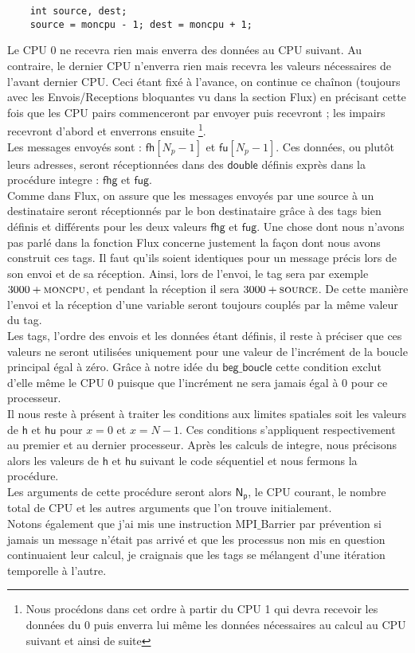 \documentclass[french]{article}
\newcommand{\hhu}{$\mathsf{h}$ et $\mathsf{hu}$}
\begin{document}
\begin{minipage}{455 pt}
\begin{lstlisting}
	int source, dest;	
	source = moncpu - 1; dest = moncpu + 1;
\end{lstlisting}
\end{minipage}

Le CPU 0 ne recevra rien mais enverra des données au CPU suivant. Au contraire, le dernier CPU n'enverra rien mais recevra les valeurs nécessaires de l'avant dernier CPU. Ceci étant fixé à l'avance, on continue ce chaînon (toujours avec les Envois/Receptions bloquantes vu dans la section Flux) en précisant cette fois que les CPU pairs commenceront par envoyer puis recevront ; les impairs recevront d'abord et enverrons ensuite \footnote{Nous procédons dans cet ordre à partir du CPU 1 qui devra recevoir les données du 0 puis enverra lui même les données nécessaires au calcul au CPU suivant et ainsi de suite}. \\
Les messages envoyés sont : $\mathsf{fh}[N_p -1]$ et $\mathsf{fu}[N_p -1]$. Ces données, ou plutôt leurs adresses, seront réceptionnées dans des $\mathsf{double}$ définis exprès dans la procédure integre : $\mathsf{fhg}$ et $\mathsf{fug}$. \\
Comme dans Flux, on assure que les messages envoyés par une source à un destinataire seront réceptionnés par le bon destinataire grâce à des tags bien définis et différents pour les deux valeurs $\mathsf{fhg}$ et $\mathsf{fug}$. Une chose dont nous n'avons pas parlé dans la fonction Flux concerne justement la façon dont nous avons construit ces tags. Il faut qu'ils soient identiques pour un message précis lors de son envoi et de sa réception. Ainsi, lors de l'envoi, le tag sera par exemple $3000 + \textsc{moncpu}$, et pendant la réception il sera  $3000 + \textsc{source}$. De cette manière l'envoi et la réception d'une variable seront toujours couplés par la même valeur du tag.\\
Les tags, l'ordre des envois et les données étant définis, il reste à préciser que ces valeurs ne seront utilisées uniquement pour une valeur de l'incrément de la boucle principal égal à zéro. Grâce à notre idée du $\mathsf{beg\_ boucle}$ cette condition exclut d'elle même le CPU 0 puisque que l'incrément ne sera jamais égal à 0 pour ce processeur.\\
Il nous reste à présent à traiter les conditions aux limites spatiales soit les valeurs de \hhu $ $ pour $x=0$ et $x=N-1$. Ces conditions s'appliquent respectivement au premier et au dernier processeur. Après les calculs de integre, nous précisons alors les valeurs de \hhu $ $ suivant le code séquentiel et nous fermons la procédure.\\
Les arguments de cette procédure seront alors $\mathsf{N_p}$, le CPU courant, le nombre total de CPU et les autres arguments que l'on trouve initialement.\\
Notons également que j'ai mis une instruction MPI$\_$Barrier par prévention si jamais un message n'était pas arrivé et que les processus non mis en question continuaient leur calcul, je craignais que les tags se mélangent d'une itération temporelle à l'autre.
\end{document}
